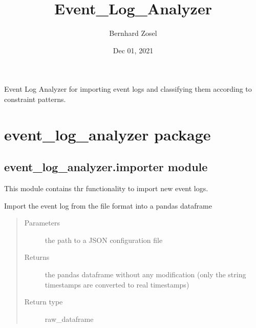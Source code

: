 \documentclass[letterpaper,10pt,english]{sphinxmanual}
\title{Event\_Log\_Analyzer}
\date{Dec 01, 2021}
\author{Bernhard Zosel}
\begin{document}
\pagestyle{empty}
\sphinxmaketitle
\pagestyle{plain}
\sphinxtableofcontents
\pagestyle{normal}
\label{\detokenize{index::doc}}


\sphinxAtStartPar
Event Log Analyzer for importing event logs and classifying them according to constraint patterns.


\chapter{event\_log\_analyzer package}
\label{\detokenize{event_log_analyzer:event-log-analyzer-package}}\label{\detokenize{event_log_analyzer::doc}}\label{\detokenize{event_log_analyzer::doc}}

\section{event\_log\_analyzer.importer module}
\label{\detokenize{event_log_analyzer:module-event_log_analyzer.importer}}\label{\detokenize{event_log_analyzer:event-log-analyzer-importer-module}}
\sphinxAtStartPar
This module contains thr functionality to import new event logs.

\begin{fulllineitems}
\label{\detokenize{event_log_analyzer:event_log_analyzer.importer.import_csv_file}}
\sphinxAtStartPar
Import the event log from the file format into a pandas dataframe
\begin{quote}\begin{description}
\item[{Parameters}] \leavevmode
\sphinxAtStartPar
{} \textendash{} the path to a JSON configuration file

\item[{Returns}] \leavevmode
\sphinxAtStartPar
the pandas dataframe without any modification (only the string timestamps are converted to real timestamps)

\item[{Return type}] \leavevmode
\sphinxAtStartPar
raw\_dataframe

\end{description}\end{quote}

\end{fulllineitems}
\end{document}
